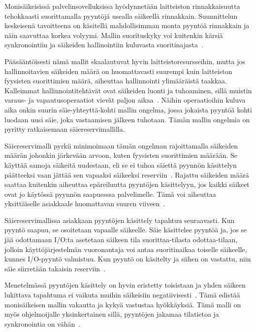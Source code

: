 \documentclass[finnish]{tktltiki2}
\theoremstyle{definition}
\theoremstyle{remark}
\begin{document}
Monisäikeisissä palvelinsovelluksissa hyödynnetään laitteiston
rinnakkaisuutta tehokkaasti suorittamalla pyyntöjä usealla säikeellä rinnakkain.
Suunnittelun keskeisenä tavoitteena on käsitellä mahdollisimman monta pyyntöä rinnakkain ja
näin saavuttaa korkea volyymi. Mallin suorituskyky voi kuitenkin
kärsiä synkronointiin ja säikeiden hallinointiin kuluvasta
suoritinajasta~\cite{pyarali_proactor_1997}.

Pääsääntöisesti nämä mallit skaalautuvat hyvin laitteistoresursseihin,
mutta jos hallinnoitavien säikeiden määrä on huomattavasti suurempi kuin laitteiston
fyysisten suorittimien määrä, aiheuttaa hallinnointi ylimääräistä taakkaa.
Kalleimmat hallinnointitehtävät ovat säikeiden luonti ja tuhoaminen, sillä
muistin varaus- ja vapautusoperaatiot vievät paljon aikaa~\cite{ling_analysis_2000}.
Näihin operaatioihin kuluva aika onkin suurin säie-yhteyttä-kohti mallin
ongelma, jossa jokaista pyyntöä kohti
luodaan uusi säie, joka vastaamisen jälkeen tuhotaan.
Tämän mallin ongelmia on pyritty ratkaisemaan säiereservimallilla.

Säiereservimalli pyrkii minimoimaan tämän ongelman rajoittamalla
säikeiden määrän johonkin järkevään arvoon, kuten fyysisten suorittimien
määrään. Se käyttää samoja säikeitä uudestaan, eli se ei tuhoa säiettä
pyynnön käsittelyn päätteeksi vaan jättää sen vapaaksi säikeeksi reserviin~\cite{ling_analysis_2000}. Rajattu säikeiden määrä saattaa kuitenkin aiheuttaa epäreiluutta
pyyntöjen käsittelyyn, jos kaikki säikeet ovat jo käytössä pyynnön 
saapuesssa palvelimelle. Tämä voi aiheuttaa yksittäiselle asiakkaale
huomattavan suuren viiveen~\cite{welsh_seda_2001}.

Säiereservimallissa asiakkaan pyyntöjen käsittely tapahtuu seuraavasti.
Kun pyyntö saapuu, se osoitetaan vapaalle säikeelle. Säie käsittelee pyyntöä ja,
jos se jää odottamaan I/O:ta asetetaan säikeen tila suorittaa-tilasta odottaa-tilaan,
jolloin käyttöjärjestelmän vuoronantaja voi antaa suoritinaikaa toiselle säikeelle,
kunnes I/O-pyyntö valmistuu. Kun pyyntö on käsitelty ja siihen on vastattu, niin
säie siirretään takaisin reserviin~\cite{ling_analysis_2000}.

Menetelmässä pyyntöjen käsittely on hyvin eristetty toisistaan ja
yhden säikeen lukittava tapahtuma ei vaikuta muihin säikeisiin negatiivisesti~\cite{davis_case_2017}.
Tämä edistää monisäikeisen mallin vakautta ja kykyä vastustaa hyökkäyksiä.
Tämä malli on myös ohjelmoijalle yksinkertainen sillä, pyyntöjen jakamaa tilatietoa
ja synkronointia on vähän~\cite{hu_applying_1998}.
\end{document}
